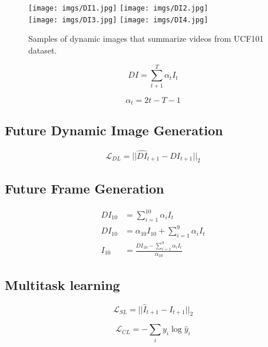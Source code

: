 \documentclass[10pt,twocolumn,letterpaper]{article}
\begin{document}
\begin{figure}[ht!]
 \centering
 \texttt{[image: imgs/DI1.jpg]}
 \hspace{-4pt}
 \texttt{[image: imgs/DI2.jpg]}\\
 \vspace{0pt}
 \texttt{[image: imgs/DI3.jpg]}
 \hspace{-4pt}
 \texttt{[image: imgs/DI4.jpg]}
 \caption{Samples of dynamic images that summarize videos from UCF101 dataset.}
 \label{fig:dis}
\end{figure}

\begin{equation}
 DI = \displaystyle \sum_{t+1}^T \alpha_t I_t
\end{equation}

\begin{equation}
 \alpha_t = 2t - T -1
\end{equation}
\subsection{Future Dynamic Image Generation}
\begin{equation}
 \mathcal{L}_{DL} = ||\hat{DI}_{t+1} - DI_{t+1}||_2
\end{equation}

\subsection{Future Frame Generation}
\begin{align}
 DI_{10} &=  \displaystyle \sum_{i=1}^{10} \alpha_i I_t \\
 DI_{10} &=  \alpha_{10}        I_{10} + \displaystyle \sum_{i=1}^{9} \alpha_i I_t \\
 I_{10} &= \frac{DI_{10} - \displaystyle \sum_{i=1}^{9} \alpha_i I_t}{\alpha_{10}}
\end{align}

\subsection{Multitask learning}
\begin{equation}
 \mathcal{L}_{SL} = ||\hat{I}_{t+1} - I_{t+1}||_2
\end{equation}

\begin{equation}
 \mathcal{L}_{CL} = - \sum_i y_i \log \hat{y}_i
\end{equation}
\end{document}
